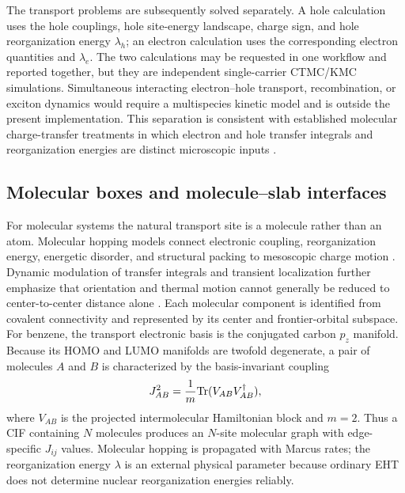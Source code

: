 \documentclass[aps,prmaterials,reprint,amsmath,amssymb,superscriptaddress,longbibliography]{revtex4-2}
\begin{document}
The transport problems are subsequently solved separately. A hole calculation uses the hole couplings, hole site-energy landscape, charge sign, and hole reorganization energy $\lambda_h$; an electron calculation uses the corresponding electron quantities and $\lambda_e$. The two calculations may be requested in one workflow and reported together, but they are independent single-carrier CTMC/KMC simulations. Simultaneous interacting electron--hole transport, recombination, or exciton dynamics would require a multispecies kinetic model and is outside the present implementation. This separation is consistent with established molecular charge-transfer treatments in which electron and hole transfer integrals and reorganization energies are distinct microscopic inputs \cite{coropceanu2007,shuai2014,shuai2020,giannini2022}.

\subsection{Molecular boxes and molecule--slab interfaces}
For molecular systems the natural transport site is a molecule rather than an atom. Molecular hopping models connect electronic coupling, reorganization energy, energetic disorder, and structural packing to mesoscopic charge motion \cite{marcus1956,coropceanu2007,ruhle2011,shuai2014,shuai2020,nenashev2015,difley2010}. Dynamic modulation of transfer integrals and transient localization further emphasize that orientation and thermal motion cannot generally be reduced to center-to-center distance alone \cite{troisi2006jpc,troisi2006prl,fratini2020,giannini2022}. Each molecular component is identified from covalent connectivity and represented by its center and frontier-orbital subspace. For benzene, the transport electronic basis is the conjugated carbon $p_z$ manifold. Because its HOMO and LUMO manifolds are twofold degenerate, a pair of molecules $A$ and $B$ is characterized by the basis-invariant coupling
\begin{equation}
J_{AB}^2=\frac{1}{m}{\rm Tr}(V_{AB}V_{AB}^{\dagger}),
\end{equation}
where $V_{AB}$ is the projected intermolecular Hamiltonian block and $m=2$. Thus a CIF containing $N$ molecules produces an $N$-site molecular graph with edge-specific $J_{ij}$ values. Molecular hopping is propagated with Marcus rates; the reorganization energy $\lambda$ is an external physical parameter because ordinary EHT does not determine nuclear reorganization energies reliably.
\end{document}
